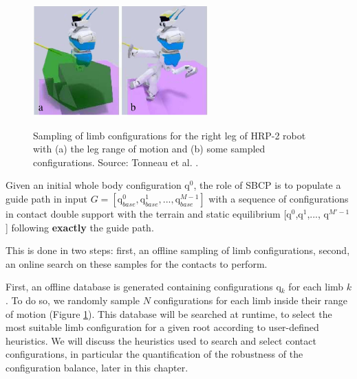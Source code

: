 \begin{figure}
    \centering
    \includegraphics[width=0.6\textwidth, height=5cm]{Figures/Chapter_CPSB/denoised_config_sampled.jpg}
    \caption{Sampling of limb configurations for the right leg of HRP-2 robot with (a) the leg range of motion and (b) some sampled configurations. Source: Tonneau et al. \cite{AcyclicCP}.}
    \label{fig:cp-sb:samples_rom}
\end{figure}

Given an initial whole body configuration $\mbox{q}^0$, the role of SBCP is to populate a guide path in input $G = [\mbox{q}_{base}^0,\mbox{q}_{base}^1,..., \mbox{q}_{base}^{M-1}]$ with a sequence of configurations in contact double support with the terrain and static equilibrium [$\mbox{q}^0$,$\mbox{q}^1$,..., $\mbox{q}^{M'-1}$] following \textbf{exactly} the guide path. 

This is done in two steps: first, an offline sampling of limb configurations, second, an online search on these samples for the contacts to perform.

First, an offline database is generated containing configurations q$_k$ for each limb $k$. %
To do so, we randomly sample $N$ configurations for each limb inside their range of motion (Figure \ref{fig:cp-sb:samples_rom}).
This database will be searched at runtime, to select the most suitable limb configuration for a given root according to user-defined heuristics.
We will discuss the heuristics used to search and select contact configurations, in particular the quantification of the robustness of the configuration balance, later in this chapter. %

